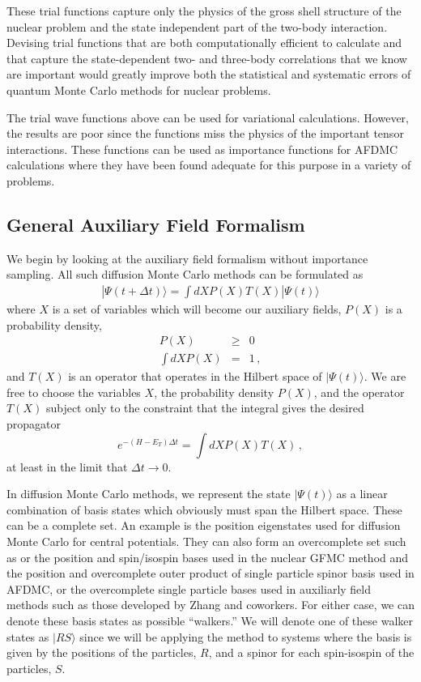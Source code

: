 These trial functions capture only the physics of the
gross shell structure of the nuclear
problem and the state independent part of the two-body interaction.
Devising trial functions that are both computationally efficient to
calculate and that capture the state-dependent two- and three-body
correlations that we know are important would greatly improve both
the statistical and systematic errors of quantum Monte Carlo methods
for nuclear problems.

The trial wave functions above can be used for variational calculations.
However, the results are poor since the functions miss the
physics of the important tensor interactions. These functions can be
used as importance functions for AFDMC calculations where they have been
found adequate for this purpose in a variety of problems.

\subsection{General Auxiliary Field Formalism}


We begin by looking at the auxiliary field formalism without importance
sampling.
All such diffusion Monte Carlo methods can be formulated as
\begin{eqnarray}
\label{eq.afdmc}
|\Psi(t+\Delta t)\rangle = \int dX P(X) T(X) |\Psi(t)\rangle
\end{eqnarray}
where $X$ is a set of variables which will become our auxiliary fields,
$P(X)$ is a probability density,
\begin{eqnarray}
P(X) &\geq& 0
\nonumber\\
\int dX P(X) &=& 1\,,
\end{eqnarray}
and $T(X)$ is an operator that operates
in the Hilbert space of $|\Psi(t)\rangle$.
We are free to choose the variables $X$, the probability density $P(X)$,
and the operator $T(X)$ subject only to the
constraint that the integral gives the desired propagator
\begin{equation}
e^{-(H-E_T)\Delta t} = \int dX P(X) T(X) \,,
\end{equation}
at least in the limit that $\Delta t \rightarrow 0$.

In diffusion Monte Carlo methods, we represent the state $|\Psi(t)\rangle$
as a linear combination of basis states which obviously must span the
Hilbert space. These can be a complete set. An example is the position
eigenstates used for diffusion Monte Carlo for central potentials.
They can also form an overcomplete set such as
or the position and spin/isospin bases used in the nuclear GFMC
method and the position and
overcomplete outer product of single particle
spinor basis used in AFDMC, or the
overcomplete single particle bases used in auxiliarly field methods
such as those developed by Zhang and coworkers. For either case, we
can denote these basis states as possible ``walkers.'' We will denote
one of these walker states
as $|RS\rangle$ since we will be applying the method to
systems where the basis is given by the positions of the particles, $R$,
and a spinor for each spin-isospin of the particles, $S$.

